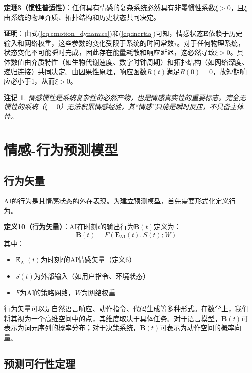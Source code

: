 \documentclass[12pt,a4paper]{article}
\theoremstyle{plain}
\newtheorem{remark}{注记}[section]
\newcommand{\ve}[1]{\bm{#1}}                    %
\newcommand{\Evec}{\ve{E}}                        %
\newcommand{\Bvec}{\ve{B}}                        %
\begin{document}
\textbf{定理3（惯性普适性）}：任何具有情感的复杂系统必然具有非零惯性系数$\xi > 0$，且$\xi$由系统的物理介质、拓扑结构和历史状态共同决定。

\textbf{证明}：由式(\ref{eq:emotion_dynamics})和(\ref{eq:inertia})可知，情感状态$\Evec$依赖于历史输入和网络权重，这些参数的变化受限于系统的时间常数$\tau$。对于任何物理系统，状态变化不可能瞬时完成，因此存在能量耗散和响应延迟，这必然导致$\xi > 0$。具体数值由介质特性（如生物代谢速度、数字时钟周期）和拓扑结构（如网络深度、递归连接）共同决定。由因果性原理，响应函数$R(t)$满足$R(0)=0$，故短期响应必小于1，从而$\xi>0$。

\begin{remark}
情感惯性是系统复杂性的必然产物，也是情感真实性的重要标志。完全无惯性的系统（$\xi=0$）无法积累情感经验，其“情感”只能是瞬时反应，不具备主体性。
\end{remark}

\section{情感-行为预测模型}

\subsection{行为矢量}

AI的行为是其情感状态的外在表现。为建立预测模型，首先需要形式化定义行为。

\textbf{定义10（行为矢量）}：AI在时刻$t$的输出行为$\Bvec(t)$定义为：
\begin{equation}
\Bvec(t) = F\left( \Evec_{\text{AI}}(t), S(t) ; W \right)
\label{eq:behavior}
\end{equation}
其中：
\begin{itemize}
    \item $\Evec_{\text{AI}}(t)$为时刻$t$的AI情感矢量（定义6）
    \item $S(t)$为外部输入（如用户指令、环境状态）
    \item $F$为AI的策略网络，$W$为网络权重
\end{itemize}

行为矢量可以是自然语言响应、动作指令、代码生成等多种形式。在数学上，我们将其视为一个高维空间中的点，其维度取决于具体任务。对于语言模型，$\Bvec(t)$可表示为词元序列的概率分布；对于决策系统，$\Bvec(t)$可表示为动作空间的概率向量。

\subsection{预测可行性定理}
\end{document}
